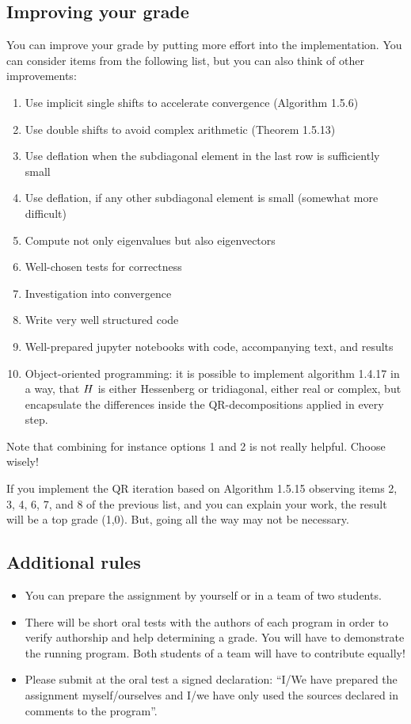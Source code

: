 \documentclass[a4paper]{article}
\begin{document}
\subsection*{Improving your grade}
You can improve your grade by putting more effort into the
implementation. You can consider items from the following list, but
you can also think of other improvements:
\begin{enumerate}
\item Use implicit single shifts to accelerate convergence (Algorithm 1.5.6)
\item Use double shifts to avoid complex arithmetic (Theorem 1.5.13)
\item Use deflation when the subdiagonal element in the last row is
  sufficiently small
\item Use deflation, if any other subdiagonal element is small (somewhat more difficult)
\item Compute not only eigenvalues but also eigenvectors
\item Well-chosen tests for correctness
\item Investigation into convergence
\item Write very well structured code
\item Well-prepared jupyter notebooks with code, accompanying text, and results
\item Object-oriented programming: it is possible to implement
  algorithm 1.4.17 in a way, that $\boldmath H$ is either Hessenberg or
  tridiagonal, either real or complex, but encapsulate the differences
  inside the QR-decompositions applied in every step.
\end{enumerate}

Note that combining for instance options 1 and 2 is not really helpful. Choose wisely!

If you implement the QR iteration based on Algorithm 1.5.15 observing items 2, 3, 4, 6, 7, and 8 of the previous list, and you can explain your work, the result will be a top grade (1,0). But, going all the way may not be necessary.

\subsection*{Additional rules}
\begin{itemize}
\item You can prepare the assignment by yourself or in a team of two
  students.
\item There will be short oral tests with the authors of each program
  in order to verify authorship and help determining a grade. You will
  have to demonstrate the running program. Both students of a team
  will have to contribute equally!
\item Please submit at the oral test a signed declaration: ``I/We have
  prepared the assignment myself/ourselves and I/we have only used the
  sources declared in comments to the program''.
\end{itemize}
\end{document}
